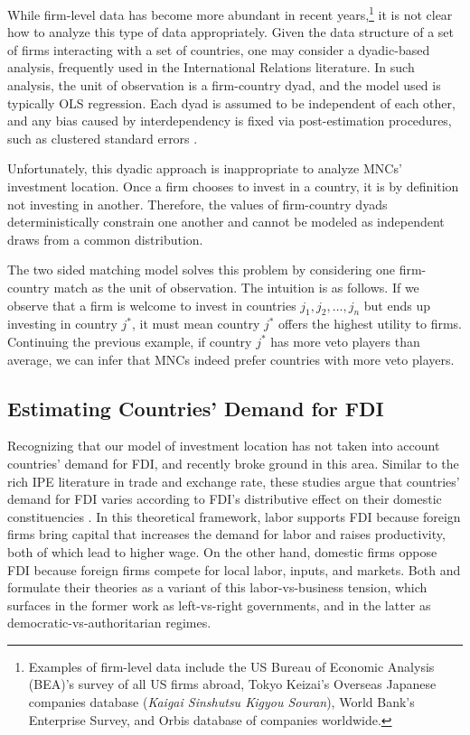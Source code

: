 While firm-level data has become more abundant in recent years,\footnote{Examples of firm-level data include the US Bureau of Economic Analysis (BEA)'s survey of all US firms abroad, Tokyo Keizai's Overseas Japanese companies database (\textit{Kaigai Sinshutsu Kigyou Souran}), World Bank's Enterprise Survey, and Orbis database of companies worldwide.} it is not clear how to analyze this type of data appropriately. Given the data structure of a set of firms interacting with a set of countries, one may consider a dyadic-based analysis, frequently used in the International Relations literature. In such analysis, the unit of observation is a firm-country dyad, and the model used is typically OLS regression. Each dyad is assumed to be independent of each other, and any bias caused by interdependency is fixed via post-estimation procedures, such as clustered standard errors \citep{Dorff2013}. 

Unfortunately, this dyadic approach is inappropriate to analyze MNCs' investment location. Once a firm chooses to invest in a country, it is by definition not investing in another. Therefore, the values of firm-country dyads deterministically constrain one another and cannot be modeled as independent draws from a common distribution.

The two sided matching model solves this problem by considering one firm-country match as the unit of observation. The intuition is as follows. If we observe that a firm is welcome to invest in countries $j_1, j_2, \dots, j_n$ but ends up investing in country $j^*$, it must mean country $j^*$ offers the highest utility to firms. Continuing the previous example, if country $j^*$ has more veto players than average, we can infer that MNCs indeed prefer countries with more veto players.

\subsection{Estimating Countries' Demand for FDI}

Recognizing that our model of investment location has not taken into account countries' demand for FDI, \citet{Pinto2013} and \citet{Pandya2016} recently broke ground in this area. Similar to the rich IPE literature in trade and exchange rate, these studies argue that countries' demand for FDI varies according to FDI's distributive effect on their domestic constituencies \citep{Broz2001, Milner2005a}. In this theoretical framework, labor supports FDI because foreign firms bring capital that increases the demand for labor and raises productivity, both of which lead to higher wage. On the other hand, domestic firms oppose FDI because foreign firms compete for local labor, inputs, and markets. Both \citet{Pinto2013} and \citet{Pandya2016} formulate their theories as a variant of this labor-vs-business tension, which surfaces in the former work as left-vs-right governments, and in the latter as democratic-vs-authoritarian regimes.

